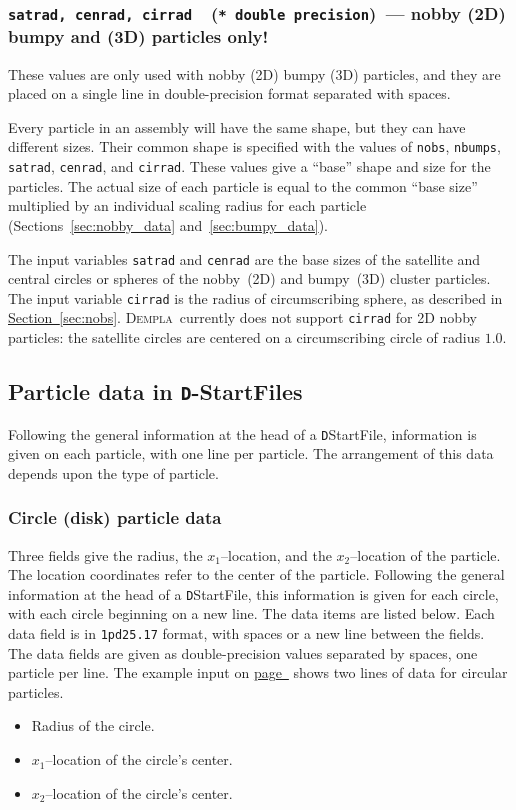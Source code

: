 \documentclass[letterpaper,11pt]{article}
\newcommand{\Dempla}{\textsc{Dempla}}
\newcommand{\Var}[2]{\texttt{#1}\ \  (\texttt{#2})}
\begin{document}
\subsubsection[\texttt{satrad}, \texttt{cenrad}, \texttt{cirrad}]
              {\Var{satrad, cenrad, cirrad}{* double precision}\ --- nobby 
              (2D) bumpy and (3D) particles only!}\label{sec:satrad}
These values are only used with nobby (2D) bumpy (3D) particles, and
they are placed on a single line in double-precision format separated with
spaces.
\par
Every particle in an assembly will have the same shape, but they
can have different sizes.  
Their common shape is specified with the values of \texttt{nobs},
\texttt{nbumps}, \texttt{satrad}, \texttt{cenrad}, and \texttt{cirrad}.
These values give a ``base'' shape and size for the particles.
The actual size of each particle is equal to the common ``base size''
multiplied by an individual scaling radius for each particle
(Sections~\ref{sec:nobby_data} and~\ref{sec:bumpy_data}).
\par
The input variables \texttt{satrad} and \texttt{cenrad} are the
base sizes of the satellite and central circles or spheres of the 
nobby~(2D) and bumpy~(3D) cluster particles.
The input variable \texttt{cirrad} is the radius of circumscribing
sphere, as described in
\hyperref[sec:nobs]{Section~\ref*{sec:nobs}}.
\Dempla\ currently does not support \texttt{cirrad} for 2D nobby particles:
the satellite circles are centered on a circumscribing circle
of radius $1.0$.
%
\subsection{Particle data in \texttt{D}-\textsf{StartFiles}}%
\label{sec:StartFile2}
Following the general information at the head of a 
\texttt{D}\textsf{StartFile}, information is given on each particle,
with one line per particle.  
The arrangement of this data depends upon the type
of particle.
\subsubsection{Circle (disk) particle data}\label{sec:circle_data}
Three fields give the radius,
the $x_{1}$--location, and the $x_{2}$--location of the particle.
The location coordinates refer to the center of the particle.
Following the general information at the head of a
\texttt{D}\textsf{StartFile}, this
information is given for each circle,
with each circle beginning on a new line.
The data items are listed below.
Each data field is in \texttt{1pd25.17} format, with
spaces or a new line between the fields.
The data fields are given as double-precision values
separated by spaces, one particle per line.
The example input on \hyperref[page:dfile]{page~\pageref*{page:dfile}}
shows two lines of data for circular particles.
\begin{itemize}
\item
Radius of the circle.
\item
$x_{1}$--location of the circle's center.
\item
$x_{2}$--location of the circle's center.
\end{itemize}
\end{document}
